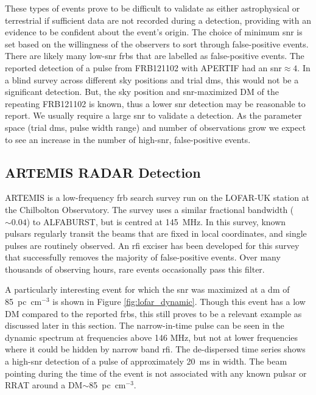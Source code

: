 \documentclass[a4paper,fleqn,usenatbib]{mnras}
\begin{document}
These types of events prove to be difficult to validate as either astrophysical
or terrestrial if sufficient data are not recorded during a detection, providing
with an evidence to be confident about the event's origin. The choice of minimum
\gls{snr} is set based on the willingness of the observers to sort through
false-positive events.  There are likely many low-\gls{snr} \glspl{frb} that are
labelled as false-positive events.  The reported detection of a pulse from
FRB121102 with APERTIF \citep{atel10693} had an \gls{snr}$\approx 4$. In a blind
survey across different sky positions and trial \glspl{dm}, this would not be a
significant detection.  But, the sky position and \gls{snr}-maximized DM of the
repeating FRB121102 is known, thus a lower \gls{snr} detection may be reasonable
to report.  We usually require a large \gls{snr} to validate a detection.  As
the parameter space (trial \glspl{dm}, pulse width range) and number of
observations grow we expect to see an increase in the number of high-\gls{snr},
false-positive events.

\subsection{ARTEMIS RADAR Detection}
\label{sec:LOFAR_RADAR}

ARTEMIS \citep{2015MNRAS.452.1254K} is a low-frequency \gls{frb} search survey
run on the LOFAR-UK station at the Chilbolton Observatory.  The survey uses a
similar fractional bandwidth ($\sim 0.04$) to ALFABURST, but is centred at
145~MHz.  In this survey, known pulsars regularly transit the beams that are
fixed in local coordinates, and single pulses are routinely observed.  An
\gls{rfi} exciser has been developed for this survey that successfully removes
the majority of false-positive events. Over many thousands of observing hours,
rare events occasionally pass this filter.

A particularly interesting event for which the \gls{snr} was maximized at a
\gls{dm} of 85~pc~cm$^{-3}$ is shown in Figure \ref{fig:lofar_dynamic}. Though
this event has a low DM compared to the reported \glspl{frb}, this still proves
to be a relevant example as discussed later in this section.  The narrow-in-time
pulse can be seen in the dynamic spectrum at frequencies above 146 MHz, but not
at lower frequencies where it could be hidden by narrow band \gls{rfi}.  The
de-dispersed time series shows a high-\gls{snr} detection of a pulse of
approximately 20~ms in width.  The beam pointing during the time of the event is
not associated with any known pulsar or RRAT around a DM$\sim$85~pc~cm$^{-3}$.
\end{document}
